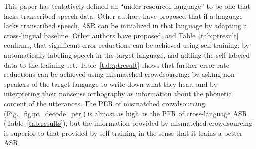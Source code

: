This paper has tentatively defined an ``under-resourced language'' to
be one that lacks transcribed speech data.  Other authors have
proposed that if a language lacks transcribed speech, ASR can be
initialized in that language by adapting a cross-lingual baseline.
Other authors have proposed, and
Table~\ref{tab:ptresult} confirms, that significant error reductions
can be achieved using self-training: by automatically labeling speech
in the target language, and adding the self-labeled data to the
training set.  Table~\ref{tab:ptresult} shows that further error rate
reductions can be achieved using mismatched crowdsourcing: by asking
non-speakers of the target language to write down what they hear, and
by interpreting their nonsense orthography as information about the
phonetic content of the utterances.  The PER of mismatched
crowdsourcing (Fig.~\ref{fig:pt_decode_per}) is almost as high as the
PER of cross-language ASR (Table~\ref{tab:results}), but the
information provided by mismatched crowdsourcing is superior to that
provided by self-training in the sense that it trains a better ASR.

